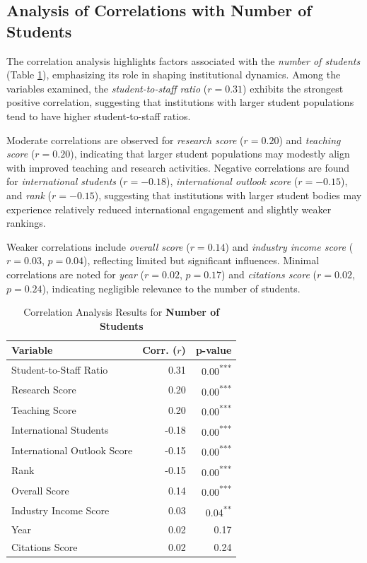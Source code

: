 \documentclass[sigconf]{acmart}
\begin{document}
\subsection{Analysis of Correlations with Number of Students}

The correlation analysis highlights factors associated with the \textit{number of students} (Table \ref{tab:correlation_number_students}), emphasizing its role in shaping institutional dynamics. Among the variables examined, the \textit{student-to-staff ratio} ($r = 0.31$) exhibits the strongest positive correlation, suggesting that institutions with larger student populations tend to have higher student-to-staff ratios.

Moderate correlations are observed for \textit{research score} ($r = 0.20$) and \textit{teaching score} ($r = 0.20$), indicating that larger student populations may modestly align with improved teaching and research activities. Negative correlations are found for \textit{international students} ($r = -0.18$), \textit{international outlook score} ($r = -0.15$), and \textit{rank} ($r = -0.15$), suggesting that institutions with larger student bodies may experience relatively reduced international engagement and slightly weaker rankings.

Weaker correlations include \textit{overall score} ($r = 0.14$) and \textit{industry income score} ($r = 0.03$, $p = 0.04$), reflecting limited but significant influences. Minimal correlations are noted for \textit{year} ($r = 0.02$, $p = 0.17$) and \textit{citations score} ($r = 0.02$, $p = 0.24$), indicating negligible relevance to the number of students.

\begin{table}[h!]
	\centering
	\caption{Correlation Analysis Results for \textbf{Number of Students}}
	\label{tab:correlation_number_students}
	\begin{tabular}{|l|r|r|}
		\hline
		\textbf{Variable} & \textbf{Corr. ($r$)} & \textbf{p-value} \\
		\hline
		Student-to-Staff Ratio & 0.31 & 0.00\textsuperscript{***} \\
		Research Score & 0.20 & 0.00\textsuperscript{***} \\
		Teaching Score & 0.20 & 0.00\textsuperscript{***} \\
		International Students & -0.18 & 0.00\textsuperscript{***} \\
		International Outlook Score & -0.15 & 0.00\textsuperscript{***} \\
		Rank & -0.15 & 0.00\textsuperscript{***} \\
		Overall Score & 0.14 & 0.00\textsuperscript{***} \\
		Industry Income Score & 0.03 & 0.04\textsuperscript{**} \\
		Year & 0.02 & 0.17 \\
		Citations Score & 0.02 & 0.24 \\
		\hline
	\end{tabular}
\end{table}
\end{document}
